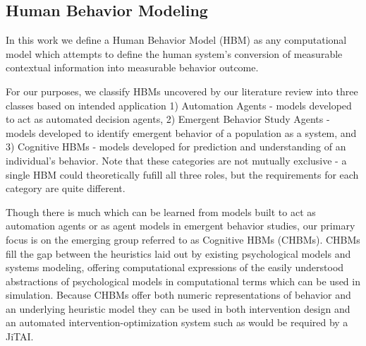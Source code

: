 \documentclass[conference]{IEEEtran}
\begin{document}
\subsection{Human Behavior Modeling}
In this work we define a Human Behavior Model (HBM) as any computational model which attempts to define the human system's conversion of measurable contextual information into measurable behavior outcome. 

For our purposes, we classify HBMs uncovered by our literature review into three classes based on intended application 1) Automation Agents\cite{wooldridge1995agent} - models developed to act as automated decision agents, 2) Emergent Behavior Study Agents\cite{li2006survey} - models developed to identify emergent behavior of a population as a system, and 3) Cognitive HBMs - models developed for prediction and understanding of an individual's behavior.
Note that these categories are not mutually exclusive - a single HBM could theoretically fufill all three roles, but the requirements for each category are quite different.

Though there is much which can be learned from models built to act as automation agents or as agent models in emergent behavior studies, our primary focus is on the emerging group referred to as Cognitive HBMs (CHBMs).
CHBMs fill the gap between the heuristics laid out by existing psychological models and systems modeling, offering computational expressions of the easily understood abstractions of psychological models in computational terms which can be used in simulation. 
Because CHBMs offer both numeric representations of behavior and an underlying heuristic model they can be used in both intervention design and an automated intervention-optimization system such as would be required by a JiTAI.
\end{document}
